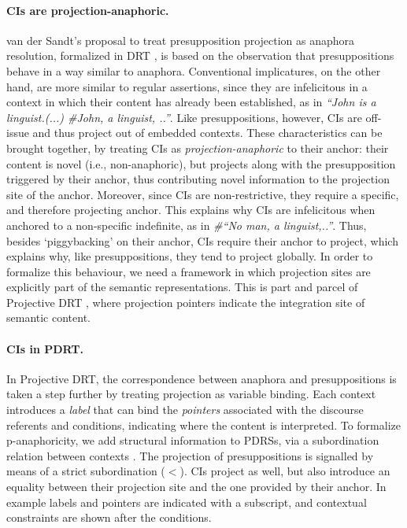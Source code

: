\documentclass[letterpaper,11pt]{article}
\begin{document}
\paragraph{CIs are projection-anaphoric.} van der Sandt's
\citep{sandt1992presupposition-short} proposal to treat presupposition
projection as anaphora resolution, formalized in DRT \cite{kamp1981theory-short},
is based on the observation that presuppositions behave in a way similar to
anaphora. Conventional implicatures, on the other hand, are more similar to
regular assertions, since they are infelicitous in a context in which their
content has already been established, as in \emph{``John is a linguist.(...)
\#John, a linguist, ..''}. Like presuppositions, however, CIs are off-issue
and thus project out of embedded contexts. These characteristics can be
brought together, by treating CIs as \emph{projection-anaphoric} to their
anchor: their content is novel (i.e., non-anaphoric), but projects along
with the presupposition triggered by their anchor, thus contributing novel
information to the projection site of the anchor.  Moreover, since CIs are
non-restrictive, they require a specific, and therefore projecting anchor.
This explains why CIs are infelicitous when anchored to a non-specific
indefinite, as in \emph{\#``No man, a linguist,..''}. Thus, besides
`piggybacking' on their anchor, CIs require their anchor to project,
which explains why, like presuppositions, they tend to project globally.
In order to formalize this
behaviour, we need a framework in which projection sites are explicitly part
of the semantic representations.  This is part and parcel of Projective DRT
\cite{venhuizen2013iwcs-short}, where projection pointers indicate
the integration site of semantic content. 

\paragraph{CIs in PDRT.} In Projective DRT, the correspondence between
anaphora and presuppositions is taken a step further by treating projection
as variable binding. Each context introduces a \emph{label} that can bind
the \emph{pointers} associated with the discourse referents and conditions,
indicating where the content is interpreted. To formalize p-anaphoricity, we
add structural information to PDRSs, via a subordination relation between
contexts \citep[cf.][]{reyle1993dealing-short}.
The projection of presuppositions is signalled by means of a strict
subordination ($<$).  CIs project as well, but also introduce an equality
between their projection site and the one provided by their anchor.  In
example \Next labels and pointers are indicated with a subscript, and
contextual constraints are shown after the conditions. 
\end{document}

